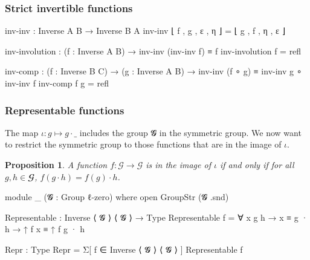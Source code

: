 \documentclass[aspectratio=169,presentation]{beamer}
\newtheorem{prop}[theorem]{Proposition}
\begin{document}
\begin{frame}
  \frametitle{Strict invertible functions}
  \begin{code}
      inv-inv : Inverse A B → Inverse B A
      inv-inv ⌊ f , g , ε , η ⌋ = ⌊ g , f , η , ε ⌋

      inv-involution :  (f : Inverse A B)
                     →  inv-inv (inv-inv f) ≡ f
      inv-involution f = refl

      inv-comp :  (f : Inverse B C)
               →  (g : Inverse A B)
               →  inv-inv (f ∘ g) ≡ inv-inv g ∘ inv-inv f
      inv-comp f g = refl
  \end{code}
\end{frame}

\begin{frame}
  \frametitle{Representable functions}
  The map \(\iota : g \mapsto g \cdot \_\) includes the group 𝓖 in the symmetric group. We now want to restrict the symmetric group to those functions that are in the image of \(\iota\).

  \begin{prop}
    A function \(f : \mathcal{G} \to \mathcal{G}\) is in the image of \(\iota\) if and only if for all \(g,h \in 𝓖\), \(f (g \cdot h) = f (g) \cdot h\).
  \end{prop}

  \pause

  \begin{code}[hide]
      module _ (𝓖 : Group ℓ-zero) where
        open GroupStr (𝓖 .snd)
  \end{code}
  \begin{code}
        Representable : Inverse ⟨ 𝓖 ⟩ ⟨ 𝓖 ⟩ → Type
        Representable f = ∀ x g h → x ≡ g · h → ↑ f x ≡ ↑ f g · h

        Repr : Type
        Repr = Σ[ f ∈ Inverse ⟨ 𝓖 ⟩ ⟨ 𝓖 ⟩ ] Representable f
  \end{code}
\end{frame}
\end{document}
